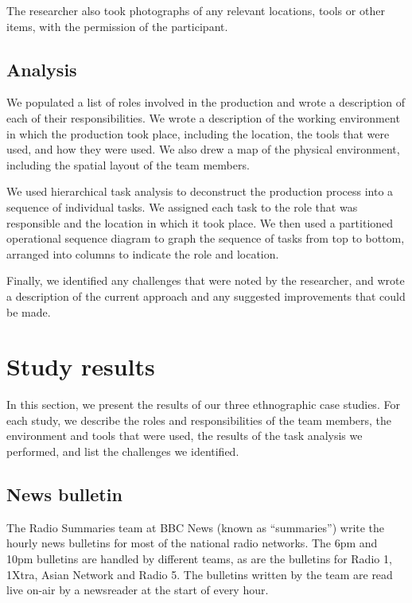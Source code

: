 The researcher also took photographs of any relevant locations, tools or other items, with the permission of the
participant.

\subsection{Analysis}

We populated a list of roles involved in the production and wrote a description of each of their responsibilities. We
wrote a description of the working environment in which the production took place, including the location, the tools
that were used, and how they were used. We also drew a map of the physical environment, including the spatial layout of
the team members.

We used hierarchical task analysis \citep{Kirwan1992,Annett2000} to deconstruct the production process into a sequence
of individual tasks. We assigned each task to the role that was responsible and the location in which it took
place. We then used a partitioned operational sequence diagram \citep{Kirwan1992} to graph the sequence of tasks from
top to bottom, arranged into columns to indicate the role and location.

Finally, we identified any challenges that were noted by the researcher, and wrote a description of the current
approach and any suggested improvements that could be made.

\section{Study results}\label{sec:ethno-results}

In this section, we present the results of our three ethnographic case studies. For each study, we describe the roles
and responsibilities of the team members, the environment and tools that were used, the results of the task analysis we
performed, and list the challenges we identified.


\subsection{News bulletin}\label{sec:news}
The Radio Summaries team at BBC News (known as ``summaries'') write the hourly news bulletins for most of the national
radio networks. The 6pm and 10pm bulletins are handled by different teams, as are the bulletins for Radio 1, 1Xtra,
Asian Network and Radio 5.  The bulletins written by the team are read live on-air by a newsreader at the start of
every hour.

